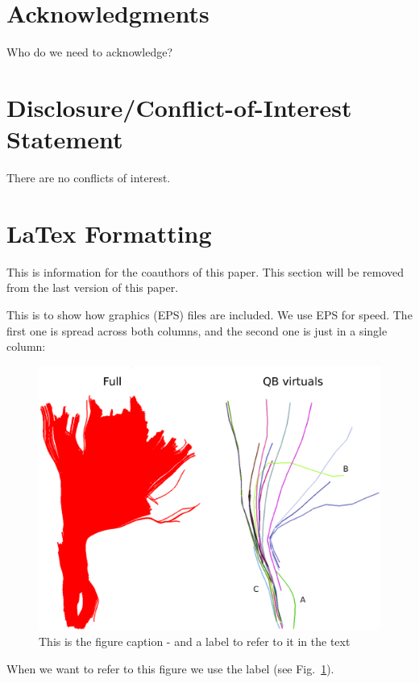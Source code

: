 \documentclass{bioinfo}
\begin{document}
\section*{Acknowledgments}
Who do we need to acknowledge?

\section*{Disclosure/Conflict-of-Interest Statement}
There are no conflicts of interest.

\section{LaTex Formatting}

This is information for the coauthors of this paper. This section will be removed from the last version of this paper.

This is to show how graphics (EPS) files are included. We use EPS for
speed. The first one is spread across both columns, and the second one
is just in a single column:

\begin{figure}
\centerline{\includegraphics[width=160mm]{Figures/Fig_4_cst_simplification_relabeled_triple.eps}}
\caption{This is the figure caption - and a label to refer to it in the text \label{Fig:big_picture}}
\end{figure}

When we want to refer to this figure we use the label (see Fig.~\ref{Fig:big_picture}).
\end{document}
